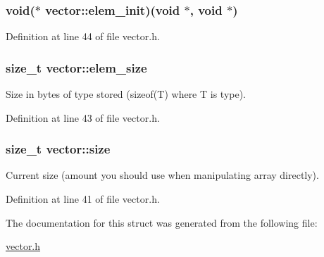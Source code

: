 \hypertarget{structvector_a9aa1b736be034d1734173299ba7874e2}{
\subsubsection[{elem\-\_\-init}]{\setlength{\rightskip}{0pt plus 5cm}void($\ast$ {\bf vector\-::elem\-\_\-init})(void $\ast$, void $\ast$)}}\label{structvector_a9aa1b736be034d1734173299ba7874e2}


\-Definition at line 44 of file vector.\-h.

\hypertarget{structvector_a5c32d3768ff522662c71cb74634bb717}{
\subsubsection[{elem\-\_\-size}]{\setlength{\rightskip}{0pt plus 5cm}size\-\_\-t {\bf vector\-::elem\-\_\-size}}}\label{structvector_a5c32d3768ff522662c71cb74634bb717}


\-Size in bytes of type stored (sizeof(\-T) where \-T is type). 



\-Definition at line 43 of file vector.\-h.

\hypertarget{structvector_a4200005b6949608d6a533db1a0d299c8}{
\subsubsection[{size}]{\setlength{\rightskip}{0pt plus 5cm}size\-\_\-t {\bf vector\-::size}}}\label{structvector_a4200005b6949608d6a533db1a0d299c8}


\-Current size (amount you should use when manipulating array directly). 



\-Definition at line 41 of file vector.\-h.



\-The documentation for this struct was generated from the following file\-:\begin{DoxyCompactItemize}
\item 
\hyperlink{vector_8h}{vector.\-h}\end{DoxyCompactItemize}
